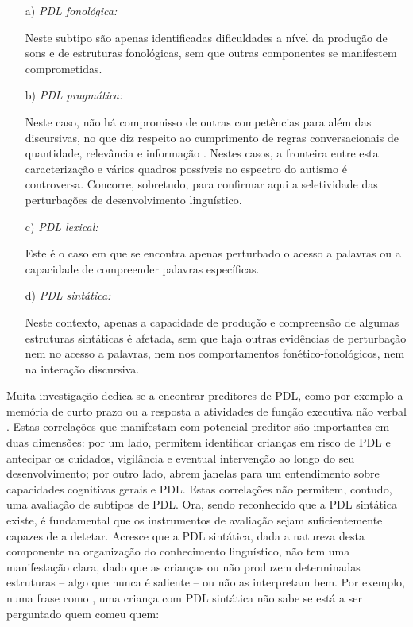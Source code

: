 \documentclass[output=paper,colorlinks,citecolor=brown,booklanguage=portuguese]{langscibook}
\begin{document}
\begin{enumerate}
    \item [a)] \emph{PDL fonológica:}
    \item[] Neste subtipo são apenas identificadas dificuldades a nível da produção de sons e de estruturas fonológicas, sem que outras componentes se manifestem comprometidas.
    \item[b)] \emph{PDL pragmática:}
    \item[] Neste caso, não há compromisso de outras competências para além das discursivas, no que diz respeito ao cumprimento de regras conversacionais de quantidade, relevância e informação \citep{Grice1975}. Nestes casos, a fronteira entre esta caracterização e vários quadros possíveis no espectro do autismo é controversa. Concorre, sobretudo, para confirmar aqui a seletividade das perturbações de desenvolvimento linguístico.
    \item[c)] \emph{PDL lexical:}
    \item[] Este é o caso em que se encontra apenas perturbado o acesso a palavras ou a capacidade de compreender palavras específicas.
    \item[d)] \emph{PDL sintática:}
    \item[] Neste contexto, apenas a capacidade de produção e compreensão de algumas estruturas sintáticas é afetada, sem que haja outras evidências de perturbação nem no acesso a palavras, nem nos comportamentos fonético-fonológicos, nem na interação discursiva.
\end{enumerate}

Muita investigação dedica-se a encontrar preditores de PDL, como por exemplo a memória de curto prazo ou a resposta a atividades de função executiva não verbal \citep{Lum2010, Lum2012, Henry2012}. Estas correlações que manifestam com potencial preditor são importantes em duas dimensões: por um lado, permitem identificar crianças em risco de PDL e antecipar os cuidados, vigilância e eventual intervenção ao longo do seu desenvolvimento; por outro lado, abrem janelas para um entendimento sobre capacidades cognitivas gerais e PDL. Estas correlações não permitem, contudo, uma avaliação de subtipos de PDL. Ora, sendo reconhecido que a PDL sintática existe, é fundamental que os instrumentos de avaliação sejam suficientemente capazes de a detetar. Acresce que a PDL sintática, dada a natureza desta componente na organização do conhecimento linguístico, não tem uma manifestação clara, dado que as crianças ou não produzem determinadas estruturas – algo que nunca é saliente -- ou não as interpretam bem. Por exemplo, numa frase como , uma criança com PDL sintática não sabe se está a ser perguntado quem comeu quem:
\end{document}
